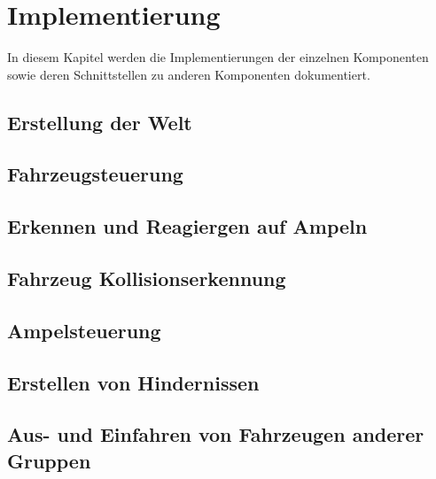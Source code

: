 
\chapter{Implementierung}
\label{Implementierung}

In diesem Kapitel werden die Implementierungen der einzelnen Komponenten sowie deren Schnittstellen zu anderen Komponenten dokumentiert.

\thispagestyle{standard}
\pagestyle{standard}

\section{Erstellung der Welt}
\label{Erstellung der Welt}

\section{Fahrzeugsteuerung}
\label{Fahrzeugsteuerung}

\section{Erkennen und Reagiergen auf Ampeln}
\label{Erkennen und Reagiergen auf Ampeln}

\section{Fahrzeug Kollisionserkennung}
\label{Fahrzeug Kollisionserkennung}

\section{Ampelsteuerung}
\label{Ampelsteuerung}

\section{Erstellen von Hindernissen}
\label{Erstellen von Hindernissen}

\section{Aus- und Einfahren von Fahrzeugen anderer Gruppen}
\label{Aus- und Einfahren von Fahrzeugen anderer Gruppen}